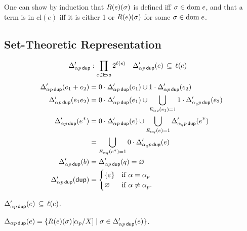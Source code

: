 \documentclass{article}
\newcommand\pdup{\mathop{\mathsf{dup}}}
\newcommand\Exp{\mathsf{Exp}}
\renewcommand\star{^{\textstyle *}}
\newcommand\clname{\mathrm{cl}}
\newcommand\cl[1]{\clname(#1)}
\begin{document}
One can show by induction that $R(e)(\sigma)$ is defined iff $\sigma\in{\rm dom\;}e$, and that a term is in $\cl e$ iff it is either 1 or $R(e)(\sigma)$ for some $\sigma\in{\rm dom\;}e$.

\subsection*{Set-Theoretic Representation}

\begin{align*}
\Delta'_{\alpha p\pdup} &: \prod_{e\in\Exp}2^{\ell(e)} & \Delta'_{\alpha p\pdup}(e) &\subs \ell(e)
\end{align*}
\begin{align*}
\Delta'_{\alpha p\pdup}(e_1+e_2) &= 0\cdot\Delta'_{\alpha p\pdup}(e_1) \cup 1\cdot\Delta'_{\alpha p\pdup}(e_2)\\
\Delta'_{\alpha p\pdup}(e_1e_2) &= 0\cdot\Delta'_{\alpha p\pdup}(e_1) \cup \bigcup_{E_{\alpha q}(e_1)=1} 1\cdot\Delta'_{\alpha_qp\pdup}(e_2)\\
\Delta'_{\alpha p\pdup}(e\star) &= 0\cdot\Delta'_{\alpha p\pdup}(e) \cup \bigcup_{E_{\alpha q}(e)=1}\Delta'_{\alpha_qp\pdup}(e\star)\\
&= \bigcup_{E_{\alpha q}(e^{\scriptstyle *})=1} 0\cdot\Delta'_{\alpha_qp\pdup}(e)\\
\Delta'_{\alpha p\pdup}(b) &= \Delta'_{\alpha p\pdup}(q) = \emptyset\\
\Delta'_{\alpha p\pdup}(\pdup) &= \begin{cases}
\{\eps\} & \text{if $\alpha=\alpha_p$}\\
\emptyset & \text{if $\alpha\neq\alpha_p$.}
\end{cases}
\end{align*}

\begin{lemma}
\label{eq:Deltacl}
$\Delta'_{\alpha p\pdup}(e) \subs \ell(e)$.
\end{lemma}

\begin{lemma}
\label{eq:DDelta}
$\Delta_{\alpha p\pdup}(e) = \set{\rep\sigma e\subst{\alpha_p}X}{\sigma\in\Delta'_{\alpha p\pdup}(e)}$.
\end{lemma}
\end{document}
